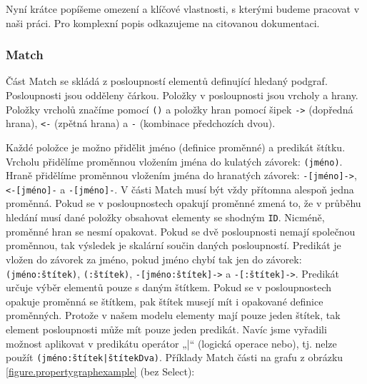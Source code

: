 Nyní krátce popíšeme omezení a klíčové vlastnosti, s kterými budeme pracovat v naši práci.
Pro komplexní popis odkazujeme na citovanou dokumentaci.

\subsubsection{Match}

Část Match se skládá z posloupností elementů definující hledaný podgraf.
Posloupnosti jsou odděleny čárkou.
Položky v posloupnosti jsou vrcholy a hrany.
Položky vrcholů značíme pomocí \texttt{()} a položky hran pomocí šipek \texttt{->} (dopředná hrana), \texttt{<-} (zpětná hrana) a \texttt{-} (kombinace předchozích dvou).

Každé položce je možno přidělit jméno (definice proměnné) a predikát štítku.
Vrcholu přidělíme proměnnou vložením jména do kulatých závorek: \texttt{(jméno)}.
Hraně přidělíme proměnnou vložením jména do hranatých závorek: \texttt{-[jméno]->}, \texttt{<-[jméno]-} a \texttt{-[jméno]-}.
V části Match musí být vždy přítomna alespoň jedna proměnná.
Pokud se v posloupnostech opakují proměnné zmená to, že v průběhu hledání musí dané položky obsahovat elementy se shodným \texttt{ID}.
Nicméně, proměnné hran se nesmí opakovat.
Pokud se dvě posloupnosti nemají společnou proměnnou, tak výsledek je skalární součin daných posloupností. 
Predikát je vložen do závorek za jméno, pokud jméno chybí tak jen do závorek: \texttt{(jméno:štítek)}, \texttt{(:štítek)}, \texttt{-[jméno:štítek]->} a \texttt{-[:štítek]->}.
Predikát určuje výběr elementů pouze s daným štítkem.
Pokud se v posloupnostech opakuje proměnná se štítkem, pak štítek musejí mít i opakované definice proměnných.
Protože v našem modelu elementy mají pouze jeden štítek, tak element posloupnosti může mít pouze jeden predikát.
Navíc jsme vyřadili možnost aplikovat v predikátu operátor „|“ (logická operace nebo), tj. nelze použít \texttt{(jméno:štítek|štítekDva)}.
Příklady Match části na grafu z obrázku \ref{figure.propertygraphexample} (bez Select):

